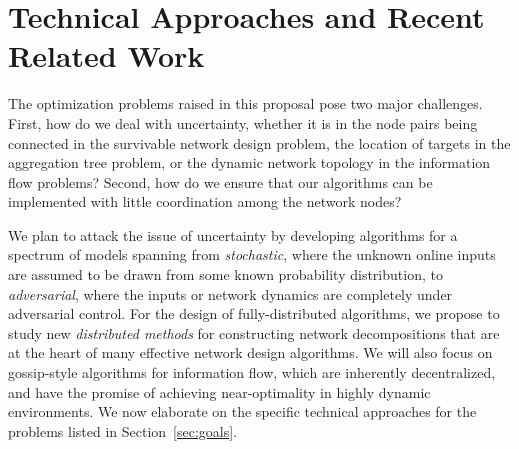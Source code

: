 \section{Technical Approaches and Recent Related Work}
The optimization problems raised in this proposal pose two major
challenges.  First, how do we deal with uncertainty, whether it is in
the node pairs being connected in the survivable network design
problem, the location of targets in the aggregation tree problem, or
the dynamic network topology in the information flow problems?
Second, how do we ensure that our algorithms can be implemented with
little coordination among the network nodes?

We plan to attack the issue of uncertainty by developing algorithms
for a spectrum of models spanning from {\em stochastic}, where the
unknown online inputs are assumed to be drawn from some known
probability distribution, to {\em adversarial}, where the inputs or
network dynamics are completely under adversarial control.  For the
design of fully-distributed algorithms, we propose to study new {\em
  distributed methods}\/ for constructing network decompositions that
are at the heart of many effective network design algorithms.  We will
also focus on gossip-style algorithms for information flow, which are
inherently decentralized, and have the promise of achieving
near-optimality in highly dynamic environments.  We now elaborate on
the specific technical approaches for the problems listed in
Section~\ref{sec:goals}.



